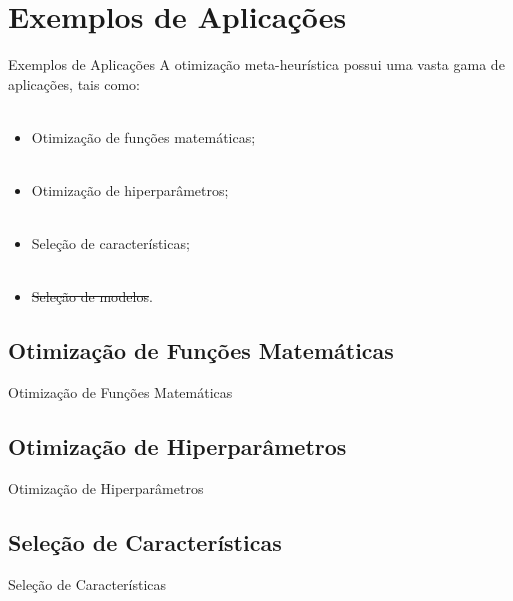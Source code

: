 \section{Exemplos de Aplicações}
\label{s.applications}

\begin{frame}{Exemplos de Aplicações}
	A otimização meta-heurística possui uma vasta gama de aplicações, tais como:
	\\~\\
	\begin{itemize}
		\justifying
		\item Otimização de funções matemáticas;
		\\~\\
		\item Otimização de hiperparâmetros;
		\\~\\
		\item Seleção de características;
		\\~\\
		\item \sout{Seleção de modelos}.
	\end{itemize}

\end{frame}

\subsection{Otimização de Funções Matemáticas}
\label{ss.applications_benchmark}

\begin{frame}{Otimização de Funções Matemáticas}
\end{frame}

\subsection{Otimização de Hiperparâmetros}
\label{ss.applications_hyperparameter}

\begin{frame}{Otimização de Hiperparâmetros}
\end{frame}

\subsection{Seleção de Características}
\label{ss.applications_feature_selection}

\begin{frame}{Seleção de Características}
\end{frame}